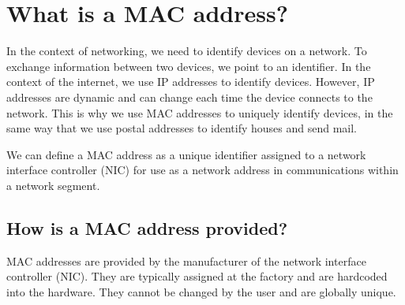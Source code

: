\documentclass{article}
\begin{document}
\section{\label{sec:Whatis}What is a MAC address?}
  In the context of networking, we need to identify devices on a network.
  To exchange information between two devices, we point to an identifier.
  In the context of the internet, we use IP addresses to identify devices.
  However, IP addresses are dynamic and can change each time the device connects to the network.
  This is why we use MAC addresses to uniquely identify devices, in the same way 
  that we use postal addresses to identify houses and send mail.

  We can define a MAC address as a unique identifier assigned to a network interface 
  controller (NIC) for use as a network address in communications within a network segment.

  \subsection{\label{sec:Provided}How is a MAC address provided?}
  MAC addresses are provided by the manufacturer of the network interface controller (NIC).
  They are typically assigned at the factory and are hardcoded into the hardware.
  They cannot be changed by the user and are globally unique.
\end{document}
